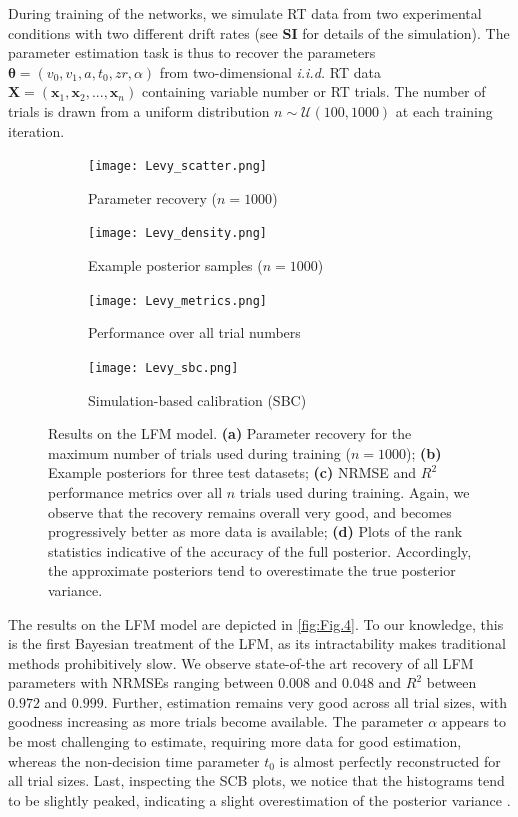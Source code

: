 \documentclass[9pt,twoside,lineno]{pnas-new}
\begin{document}
During training of the networks, we simulate RT data from two experimental conditions with two different drift rates (see \textbf{SI} for details of the simulation). The parameter estimation task is thus to recover the parameters $\boldsymbol{\theta} = (v_{0}, v_{1}, a, t_{0}, zr, \alpha)$ from two-dimensional \textit{i.i.d.} RT data $\boldsymbol{X} = (\boldsymbol{x}_{1},\boldsymbol{x}_{2},...,\boldsymbol{x}_{n})$ containing variable number or RT trials. The number of trials is drawn from a uniform distribution $n \sim \mathcal{U}(100, 1000)$ at each training iteration.
\begin{figure}[H]
\centering
\begin{subfigure}{.49\textwidth}
    \centering
    \texttt{[image: Levy\_scatter.png]}
    \caption{Parameter recovery ($n=1000$)}
    \label{fig:Fig.5a}
\end{subfigure}
\begin{subfigure}{.49\textwidth}
    \centering
    \texttt{[image: Levy\_density.png]}
    \caption{Example posterior samples ($n=1000$)}
    \label{fig:Fig.5b}
\end{subfigure}
\begin{subfigure}{.49\textwidth}
    \centering
    \texttt{[image: Levy\_metrics.png]}
    \caption{Performance over all trial numbers}
    \label{fig:Fig.5c}
\end{subfigure}
\begin{subfigure}{.49\textwidth}
    \centering
    \texttt{[image: Levy\_sbc.png]}
    \caption{Simulation-based calibration (SBC)}
    \label{fig:Fig.5d}
\end{subfigure}
\caption[short]{Results on the LFM model. \textbf{(a)} Parameter recovery for the maximum number of trials used during training ($n=1000$); \textbf{(b)} Example posteriors for three test datasets; \textbf{(c)} NRMSE and $R^{2}$ performance metrics over all $n$ trials used during training. Again, we observe that the recovery remains overall very good, and becomes progressively better as more data is available; \textbf{(d)} Plots of the rank statistics indicative of the accuracy of the full posterior. Accordingly, the approximate posteriors tend to overestimate the true posterior variance.} \label{fig:Fig.5}
\end{figure}

The results on the LFM model are depicted in \autoref{fig:Fig.4}. To our knowledge, this is the first Bayesian treatment of the LFM, as its intractability makes traditional methods prohibitively slow. We observe state-of-the art recovery of all LFM parameters with NRMSEs ranging between $0.008$ and $0.048$ and $R^{2}$ between $0.972$ and $0.999$. Further, estimation remains very good across all trial sizes, with goodness increasing as more trials become available. The parameter $\alpha$ appears to be most challenging to estimate, requiring more data for good estimation, whereas the non-decision time parameter $t_{0}$ is almost perfectly reconstructed for all trial sizes. Last, inspecting the SCB plots, we notice that the histograms tend to be slightly peaked, indicating a slight overestimation of the posterior variance \cite{talts2018validating}.
\end{document}
